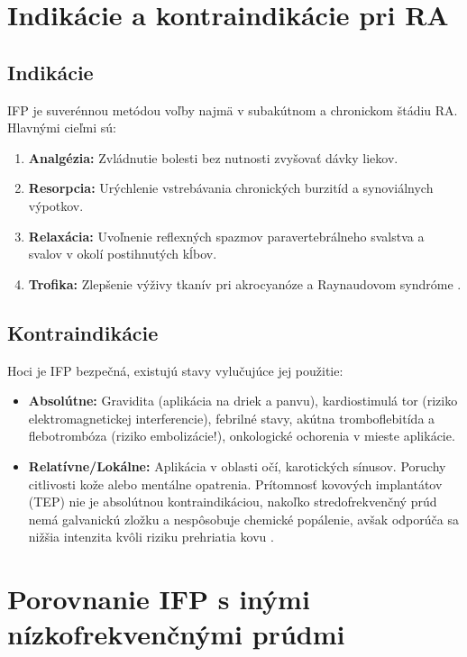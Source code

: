 \section{Indikácie a kontraindikácie pri RA}

\subsection{Indikácie}

IFP je suverénnou metódou voľby najmä v subakútnom a chronickom štádiu RA. Hlavnými cieľmi sú:

\begin{enumerate}
    \item \textbf{Analgézia:} Zvládnutie bolesti bez nutnosti zvyšovať dávky liekov.
    \item \textbf{Resorpcia:} Urýchlenie vstrebávania chronických burzitíd a synoviálnych výpotkov.
    \item \textbf{Relaxácia:} Uvoľnenie reflexných spazmov paravertebrálneho svalstva a svalov v okolí postihnutých kĺbov.
    \item \textbf{Trofika:} Zlepšenie výživy tkanív pri akrocyanóze a Raynaudovom syndróme \parencite{Kolar2012, Capko1998}.
\end{enumerate}

\subsection{Kontraindikácie}

Hoci je IFP bezpečná, existujú stavy vylučujúce jej použitie:

\begin{itemize}
    \item \textbf{Absolútne:} Gravidita (aplikácia na driek a panvu), kardiostimulá tor (riziko elektromagnetickej interferencie), febrilné stavy, akútna tromboflebitída a flebotrombóza (riziko embolizácie!), onkologické ochorenia v mieste aplikácie.
    \item \textbf{Relatívne/Lokálne:} Aplikácia v oblasti očí, karotických sínusov. Poruchy citlivosti kože alebo mentálne opatrenia. Prítomnosť kovových implantátov (TEP) nie je absolútnou kontraindikáciou, nakoľko stredofrekvenčný prúd nemá galvanickú zložku a nespôsobuje chemické popálenie, avšak odporúča sa nižšia intenzita kvôli riziku prehriatia kovu \parencite{Watson2020}.
\end{itemize}

\section{Porovnanie IFP s inými nízkofrekvenčnými prúdmi}

